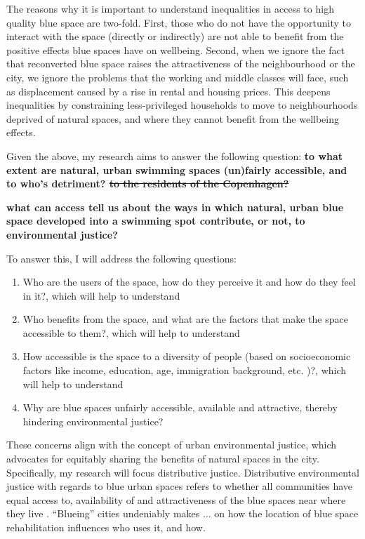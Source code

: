 \documentclass{article}
\begin{document}
The reasons why it is important to understand inequalities in access to high quality blue space are two-fold. 
First, those who do not have the opportunity to interact with the space (directly or indirectly) are not able to benefit from the positive effects blue spaces have on wellbeing. %
Second, when we ignore the fact that reconverted blue space raises the attractiveness of the neighbourhood or the city, we ignore the problems that the working and middle classes will face, such as displacement caused by a rise in rental and housing prices. This deepens inequalities by constraining less-privileged households to move to neighbourhoods deprived of natural spaces, and where they cannot benefit from the wellbeing effects.

Given the above, my research aims to answer the following question: \textbf{to what extent are natural, urban swimming spaces (un)fairly accessible, and to who's detriment? \sout{to the residents of the Copenhagen?}}


\textbf{what can access tell us about the ways in which natural, urban blue space developed into a swimming spot contribute, or not, to environmental justice?}

To answer this, I will address the following questions:

\begin{enumerate}
	\item Who are the users of the space, how do they perceive it and how do they feel in it?, which will help to understand
	\item Who benefits from the space, and what are the factors that make the space accessible to them?, which will help to understand
	\item How accessible is the space to a diversity of people (based on socioeconomic factors like income, education, age, immigration background, etc. \parencite{baro2021school})?, which will help to understand
	\item Why are blue spaces unfairly accessible, available and attractive, thereby hindering environmental justice?
\end{enumerate}


These concerns align with the concept of urban environmental justice, which advocates for equitably sharing the benefits of natural spaces  in the city. Specifically, my research will focus distributive justice. Distributive environmental justice with regards to blue urban spaces refers to whether all communities have equal access to, availability of and attractiveness of the blue spaces near where they live \parencite{kronenberg2020environmental}. 
``Blueing'' cities undeniably makes ...
 on how the location of blue space rehabilitation influences who uses it, and how.
 
\end{document}
